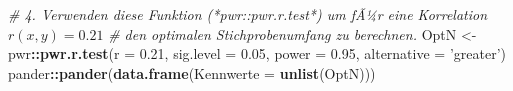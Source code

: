 \documentclass[]{article}
\newenvironment{Shaded}{\begin{snugshade}}{\end{snugshade}}
\newcommand{\CommentTok}[1]{\textcolor[rgb]{0.56,0.35,0.01}{\textit{#1}}}
\newcommand{\DataTypeTok}[1]{\textcolor[rgb]{0.13,0.29,0.53}{#1}}
\newcommand{\FloatTok}[1]{\textcolor[rgb]{0.00,0.00,0.81}{#1}}
\newcommand{\KeywordTok}[1]{\textcolor[rgb]{0.13,0.29,0.53}{\textbf{#1}}}
\newcommand{\NormalTok}[1]{#1}
\newcommand{\OperatorTok}[1]{\textcolor[rgb]{0.81,0.36,0.00}{\textbf{#1}}}
\newcommand{\StringTok}[1]{\textcolor[rgb]{0.31,0.60,0.02}{#1}}
\begin{document}
\begin{Shaded}
\begin{Highlighting}[]
  \CommentTok{# 4. Verwenden diese Funktion (*pwr::pwr.r.test*) um fÃ¼r eine Korrelation $r(x,y) = 0.21$ }
  \CommentTok{#    den optimalen Stichprobenumfang zu berechnen.  }
\NormalTok{    OptN <-}\StringTok{ }\NormalTok{pwr}\OperatorTok{::}\KeywordTok{pwr.r.test}\NormalTok{(}\DataTypeTok{r =} \FloatTok{0.21}\NormalTok{, }\DataTypeTok{sig.level =} \FloatTok{0.05}\NormalTok{, }\DataTypeTok{power =} \FloatTok{0.95}\NormalTok{, }\DataTypeTok{alternative =} \StringTok{'greater'}\NormalTok{)}
\NormalTok{    pander}\OperatorTok{::}\KeywordTok{pander}\NormalTok{(}\KeywordTok{data.frame}\NormalTok{(}\DataTypeTok{Kennwerte =} \KeywordTok{unlist}\NormalTok{(OptN)))}
\end{Highlighting}
\end{Shaded}
\end{document}
